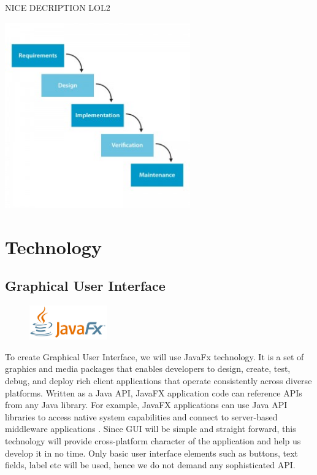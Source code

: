 \documentclass{article}
\begin{document}
{\color{red} NICE DECRIPTION LOL2}

\begin{center}

	\includegraphics[width=80mm]{images/waterfall_model.jpg}

\end{center}


\section{Technology}



\subsection{Graphical User Interface}

\begin{figure}
  \begin{center}
    \includegraphics[width=0.3\textwidth]{images/javafx_logo.png}
  \end{center}
\end{figure}

To create Graphical User Interface, we will use JavaFx technology. It is a set of graphics and media packages that enables developers to design, create, test, debug, and deploy rich client applications that operate consistently across diverse platforms. Written as a Java API, JavaFX application code can reference APIs from any Java library. For example, JavaFX applications can use Java API libraries to access native system capabilities and connect to server-based middleware applications \cite{javafx_description}. Since GUI will be simple and straight forward, this technology will provide cross-platform character of the application and help us develop it in no time. Only basic user interface elements such as buttons, text fields, label etc will be used, hence we do not demand any sophisticated API.
\end{document}
